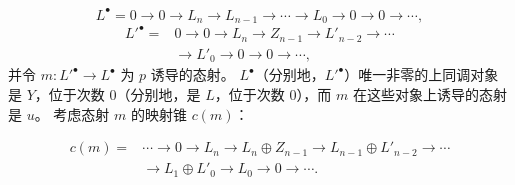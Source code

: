 \[
L^\bullet=0\longrightarrow0\longrightarrow L_n\longrightarrow L_{n-1}
\longrightarrow\cdots\longrightarrow L_0\longrightarrow0
\longrightarrow0\longrightarrow\cdots ,
\]
\[
\begin{aligned}
{L'}^\bullet={}&0\longrightarrow0\longrightarrow L_n
\longrightarrow Z_{n-1}\longrightarrow L'_{n-2}
\longrightarrow\cdots\\
&\longrightarrow L'_0\longrightarrow0\longrightarrow0
\longrightarrow\cdots ,
\end{aligned}
\]
并令 $m\colon {L'}^\bullet\longrightarrow L^\bullet$ 为 $p$ 诱导的态射。
$L^\bullet$（分别地，${L'}^\bullet$）唯一非零的上同调对象是 $Y$，位于次数
$0$（分别地，是 $L$，位于次数 $0$），而 $m$ 在这些对象上诱导的态射是 $u$。
考虑态射 $m$ 的映射锥 $c(m)$：

\[
\begin{aligned}
c(m)={}&\cdots\longrightarrow0\longrightarrow L_n
\longrightarrow L_n\oplus Z_{n-1}
\longrightarrow L_{n-1}\oplus L'_{n-2}\longrightarrow\cdots\\
&\longrightarrow L_1\oplus L'_0\longrightarrow L_0
\longrightarrow0\longrightarrow\cdots.
\end{aligned}
\]
\endgroup
